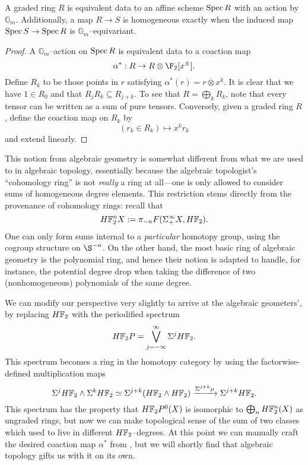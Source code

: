 \begin{lemma}\label{GradedAndGmEquivAgree}
A graded ring $R$ is equivalent data to an affine scheme $\operatorname{Spec} R$ with an action by $\mathbb G_m$.  Additionally, a map $R \to S$ is homogeneous exactly when the induced map $\operatorname{Spec} S \to \operatorname{Spec} R$ is $\mathbb G_m$--equivariant.
\end{lemma}
\begin{proof}
A $\mathbb G_m$--action on $\operatorname{Spec} R$ is equivalent data to a coaction map \[\alpha^*: R \to R \otimes \F_2[x^\pm].\]  Define $R_k$ to be those points in $r$ satisfying $\alpha^*(r) = r \otimes x^k$.  It is clear that we have $1 \in R_0$ and that $R_j R_k \subseteq R_{j+k}$.  To see that $R = \bigoplus_k R_k$, note that every tensor can be written as a sum of pure tensors.  Conversely, given a graded ring $R$, define the coaction map on $R_k$ by \[(r_k \in R_k) \mapsto x^k r_k\] and extend linearly.
\end{proof}

This notion from algebraic geometry is somewhat different from what we are used to in algebraic topology, essentially because the algebraic topologist's ``cohomology ring'' is not \emph{really} a ring at all---one is only allowed to consider sums of homogeneous degree elements.  This restriction stems directly from the provenance of cohomology rings: recall that \[\HFtwo^n X := \pi_{-n} F(\Susp^\infty_+ X, \HFtwo).\]  One can only form sums internal to a \emph{particular} homotopy group, using the cogroup structure on $\S^{-n}$.  On the other hand, the most basic ring of algebraic geometry is the polynomial ring, and hence their notion is adapted to handle, for instance, the potential degree drop when taking the difference of two (nonhomogeneous) polynomials of the same degree.

We can modify our perspective very slightly to arrive at the algebraic geometers', by replacing $\HFtwo$ with the periodified spectrum \[\HFtwo P = \bigvee_{j=-\infty}^\infty \Susp^j \HFtwo.\]  This spectrum becomes a ring in the homotopy category by using the factorwise-defined multiplication maps \[\Susp^j \HFtwo \sm \Susp^k \HFtwo \simeq \Susp^{j+k} (\HFtwo \sm \HFtwo) \xrightarrow{\Susp^{j+k} \mu} \Susp^{j+k} \HFtwo.\]  This spectrum has the property that $\HFtwo P^0(X)$ is isomorphic to $\bigoplus_n \HFtwo^n(X)$ as ungraded rings, but now we can make topological sense of the sum of two classes which used to live in different $\HFtwo$--degrees.  At this point we can manually craft the desired coaction map $\alpha^*$ from , but we will shortly find that algebraic topology gifts us with it on its own.

